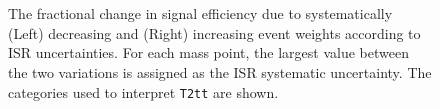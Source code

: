 \begin{figure}[h!]
  \begin{center}
    \\
    \\
    \caption{\label{fig:sms-isr-t2tt}The fractional change in signal
      efficiency due to systematically (Left) decreasing and (Right)
      increasing event weights according to ISR uncertainties. For
      each mass point, the largest value between the two variations is assigned
      as the ISR systematic uncertainty. The categories used to interpret \texttt{T2tt} are shown.}
  \end{center}
\end{figure}

